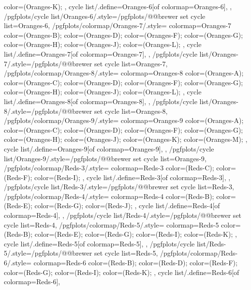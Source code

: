 {{{      color=(Oranges-K);
    },
    cycle list/.define={Oranges-6}{[of colormap=Oranges-6]},
  },
  /pgfplots/cycle list/Oranges-6/.style={/pgfplots/@@brewer set cycle list={Oranges-6}},
  /pgfplots/colormap/Oranges-7/.style={
    colormap={Oranges-7}{
      color=(Oranges-B);
      color=(Oranges-D);
      color=(Oranges-F);
      color=(Oranges-G);
      color=(Oranges-H);
      color=(Oranges-J);
      color=(Oranges-L);
    },
    cycle list/.define={Oranges-7}{[of colormap=Oranges-7]},
  },
  /pgfplots/cycle list/Oranges-7/.style={/pgfplots/@@brewer set cycle list={Oranges-7}},
  /pgfplots/colormap/Oranges-8/.style={
    colormap={Oranges-8}{
      color=(Oranges-A);
      color=(Oranges-C);
      color=(Oranges-D);
      color=(Oranges-F);
      color=(Oranges-G);
      color=(Oranges-H);
      color=(Oranges-J);
      color=(Oranges-L);
    },
    cycle list/.define={Oranges-8}{[of colormap=Oranges-8]},
  },
  /pgfplots/cycle list/Oranges-8/.style={/pgfplots/@@brewer set cycle list={Oranges-8}},
  /pgfplots/colormap/Oranges-9/.style={
    colormap={Oranges-9}{
      color=(Oranges-A);
      color=(Oranges-C);
      color=(Oranges-D);
      color=(Oranges-F);
      color=(Oranges-G);
      color=(Oranges-H);
      color=(Oranges-J);
      color=(Oranges-K);
      color=(Oranges-M);
    },
    cycle list/.define={Oranges-9}{[of colormap=Oranges-9]},
  },
  /pgfplots/cycle list/Oranges-9/.style={/pgfplots/@@brewer set cycle list={Oranges-9}},
  /pgfplots/colormap/Reds-3/.style={
    colormap={Reds-3}{
      color=(Reds-C);
      color=(Reds-F);
      color=(Reds-I);
    },
    cycle list/.define={Reds-3}{[of colormap=Reds-3]},
  },
  /pgfplots/cycle list/Reds-3/.style={/pgfplots/@@brewer set cycle list={Reds-3}},
  /pgfplots/colormap/Reds-4/.style={
    colormap={Reds-4}{
      color=(Reds-B);
      color=(Reds-E);
      color=(Reds-G);
      color=(Reds-J);
    },
    cycle list/.define={Reds-4}{[of colormap=Reds-4]},
  },
  /pgfplots/cycle list/Reds-4/.style={/pgfplots/@@brewer set cycle list={Reds-4}},
  /pgfplots/colormap/Reds-5/.style={
    colormap={Reds-5}{
      color=(Reds-B);
      color=(Reds-E);
      color=(Reds-G);
      color=(Reds-I);
      color=(Reds-K);
    },
    cycle list/.define={Reds-5}{[of colormap=Reds-5]},
  },
  /pgfplots/cycle list/Reds-5/.style={/pgfplots/@@brewer set cycle list={Reds-5}},
  /pgfplots/colormap/Reds-6/.style={
    colormap={Reds-6}{
      color=(Reds-B);
      color=(Reds-D);
      color=(Reds-F);
      color=(Reds-G);
      color=(Reds-I);
      color=(Reds-K);
    },
    cycle list/.define={Reds-6}{[of colormap=Reds-6]},
}}
